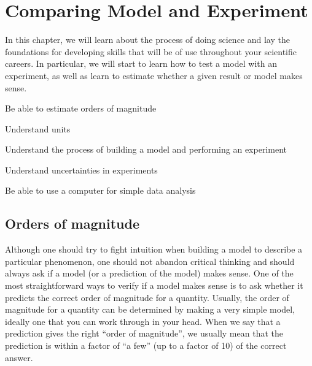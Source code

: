 %

\chapter{Comparing Model and Experiment}
\label{chap:2_ModelAndExperiment}
In this chapter, we will learn about the process of doing science and lay the foundations for developing skills that will be of use throughout your scientific careers. In particular, we will start to learn how to test a model with an experiment, as well as learn to estimate whether a given result or model makes sense.
\vspace{1cm}
\begin{learningObjectives}
\item Be able to estimate orders of magnitude
\item Understand units
\item Understand the process of building a model and performing an experiment
\item Understand uncertainties in experiments
\item Be able to use a computer for simple data analysis
\end{learningObjectives}
 
\section{Orders of magnitude}
Although one should try to fight intuition when building a model to describe a particular phenomenon, one should not abandon critical thinking and should always ask if a model (or a prediction of the model) makes sense. One of the most straightforward ways to verify if a model makes sense is to ask whether it predicts the correct order of magnitude for a quantity. Usually, the order of magnitude for a quantity can be determined by making a very simple model, ideally one that you can work through in your head. When we say that a prediction gives the right ``order of magnitude'', we usually mean that the prediction is within a factor of ``a few'' (up to a factor of 10) of the correct answer.

